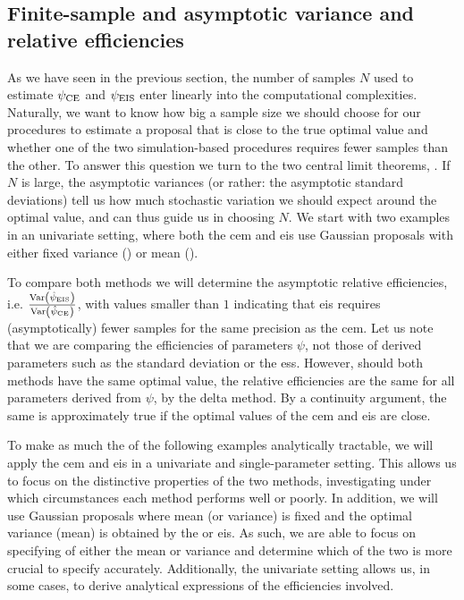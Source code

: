 \subsection{Finite-sample and asymptotic variance and relative efficiencies}
As we have seen in the previous section, the number of samples $N$ used to estimate ${\psi_{\text{CE}}}$ and ${\psi_{\text{EIS}}}$ enter linearly into the computational complexities. Naturally, we want to know how big a sample size we should choose for our procedures to estimate a proposal that is close to the true optimal value and whether one of the two simulation-based procedures requires fewer samples than the other. To answer this question we turn to the two central limit theorems, . If $N$ is large, the asymptotic variances (or rather: the asymptotic standard deviations) tell us how much stochastic variation we should expect around the optimal value, and can thus guide us in choosing $N$. 
We start with two examples in an univariate setting, where both the \gls{cem} and \gls{eis} use Gaussian proposals with either fixed variance () or mean ().

To compare both methods we will determine the asymptotic relative efficiencies, i.e. $ \frac{\operatorname{Var} \left( {\hat\psi_{\text{EIS}}} \right)}{\operatorname{Var} \left( {\hat\psi_{\text{CE}}} \right)}$, with values smaller than $1$ indicating that \gls{eis} requires (asymptotically) fewer samples for the same precision as the \gls{cem}.
Let us note that we are comparing the efficiencies of parameters $\psi$, not those of derived parameters such as the standard deviation or the \gls{ess}. However, should both methods have the same optimal value, the relative efficiencies are the same for all parameters derived from $\psi$, by the delta method. By a continuity argument, the same is approximately true if the optimal values of the \gls{cem} and \gls{eis} are close.

To make as much the of the following examples analytically tractable, we will apply the \acrshort{cem} and \acrshort{eis} in a univariate and single-parameter setting. This allows us to focus on the distinctive properties of the two methods, investigating under which circumstances each method performs well or poorly. In addition, we will use Gaussian proposals where mean (or variance) is fixed and the optimal variance (mean) is obtained by the  or \acrshort{eis}.
As such, we are able to focus on specifying of either the mean or variance and determine which of the two is more crucial to specify accurately. Additionally, the univariate setting allows us, in some cases, to derive analytical expressions of the efficiencies involved.

